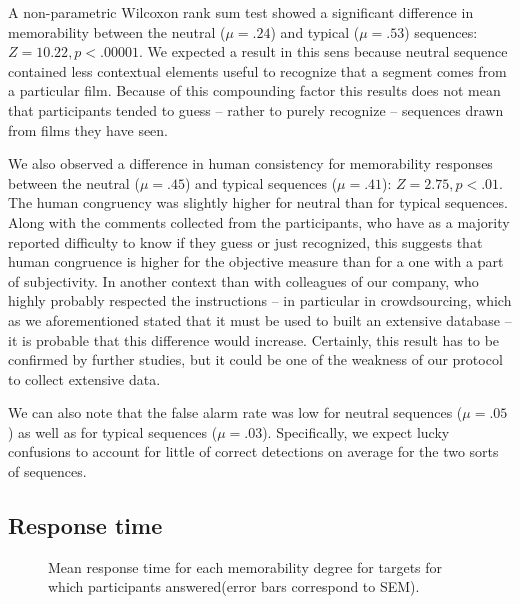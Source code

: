 \documentclass[sigconf]{acmart}
\begin{document}
A non-parametric Wilcoxon rank sum test showed a significant difference in memorability between the neutral ($\mu=.24$) and typical ($\mu=.53$) sequences: $Z=10.22, p<.00001$.
We expected a result in this sens because neutral sequence contained less contextual elements useful to recognize that a segment comes from a particular film.
Because of this compounding factor this results does not mean that participants tended to guess -- rather to purely recognize -- sequences drawn from films they have seen.

We also observed a difference in human consistency for memorability responses between the neutral ($\mu=.45$) and typical sequences ($\mu=.41$): $Z=2.75, p<.01$.
The human congruency was slightly higher for neutral than for typical sequences.
Along with the comments collected from the participants, who have as a majority reported difficulty to know if they guess or just recognized, this suggests that human congruence is higher for the objective measure than for a one with a part of subjectivity. In another context than with colleagues of our company, who highly probably respected the instructions -- in particular in crowdsourcing, which as we aforementioned stated that it must be used to built an extensive database -- it is probable that this difference would increase.
Certainly, this result has to be confirmed by further studies, but it could be one of the weakness of our protocol to collect extensive data.

We can also note that the false alarm rate was low for neutral sequences ($\mu=.05$) as well as for typical sequences ($\mu=.03$).
Specifically, we expect lucky confusions to account for little of correct detections on average for the two sorts of sequences.

\subsection{Response time}
\begin{figure}[!htbp]
	\centering
	\caption{\label{fig:response_time_vs_memorability}Mean response time for each memorability degree for targets for which participants answered(error bars correspond to SEM).}
\end{figure}
\end{document}
